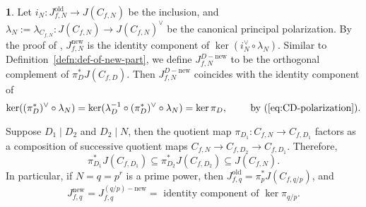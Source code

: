\documentclass{amsart}[11pt]
\theoremstyle{definition}
\newtheorem{sect}[thm]{}
\numberwithin{equation}{section}
\theoremstyle{notitle}
\begin{document}
\begin{sect}
  Let $i_N : J_{f,N}^{\mathrm{old}}\to J(C_{f,N})$ be the inclusion, and
  $\lambda_N:=\lambda_{C_{f,N}}:J(C_{f,N})\to J(C_{f,N})^\vee$ be the
  canonical principal polarization.  By
  the proof of \cite[Theorem 19.1]{Mumford_AV}, $J_{f,N}^{\mathrm{new}}$ is the
  identity component of $\ker(i_N^\vee\circ \lambda_N)$.  Similar to
  Definition~\ref{defn:def-of-new-part}, we define $J_{f,N}^{D-{\mathrm{new}}}$
  to be the orthogonal complement of $\pi_D^*J(C_{f,D})$. Then
  $J_{f,N}^{D-{\mathrm{new}}}$ coincides with the identity component of 
\[\ker((\pi_D^*)^\vee\circ \lambda_N)=\ker(\lambda_D^{-1}\circ
(\pi_D^*)^\vee\circ \lambda_N )= \ker \pi_D,  \qquad \text{ by }  (\ref{eq:CD-polarization}).\] 

Suppose $D_1\mid D_2$ and $D_2\mid N$, then the quotient map
$\pi_{D_1}: C_{f, N}\to C_{f,D_1}$ factors as a composition of
successive quotient maps $ C_{f,N}\to C_{f, D_2}\to C_{f,D_1}.$
Therefore,
\[ \pi_{D_1}^*J(C_{f, D_1})\subseteq \pi_{D_2}^* J(C_{f, D_2})
\subseteq J(C_{f, N}).\] 
In particular, if $N=q=p^r$ is a prime power, then 
$J_{f,q}^{\mathrm{old}}= \pi_p^* J(C_{f, q/p})$, and 
\[ J_{f,q}^{\mathrm{new}}= J_{f,q}^{(q/p)-{\mathrm{new}}}= \text{ identity component of }
\ker \pi_{q/p} .\]
\end{sect}
\end{document}
